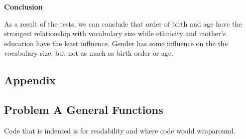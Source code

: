 \documentclass[11pt]{article}  %
\begin{document}
\textbf{Conclusion}
As a result of the tests, we can conclude that order of birth and age have the strongest relationship with vocabulary size while ethnicity and mother's education have the least influence. Gender has some influence on the the vocabulary size, but not as much as birth order or age.
\clearpage
\begin{center}
\appendix\section{Appendix}
\label{app}
\end{center}

\subsection{Problem A General Functions}
\label{sec:probagen}
Code that is indented is for readability and where code would wraparound.
\end{document}
